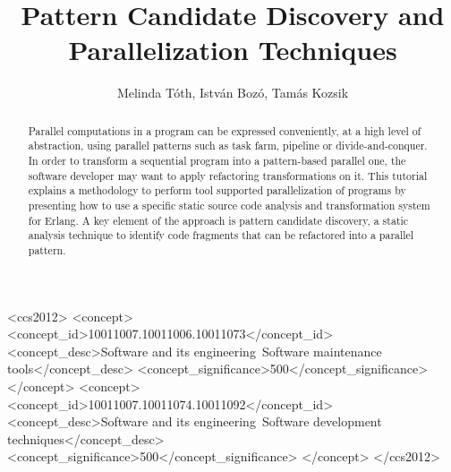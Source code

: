 \documentclass[sigconf]{acmart}
\begin{document}
\title[Pattern Candidate Discovery and Parallelization Techniques]{Pattern Candidate Discovery and \\ Parallelization Techniques}

\author{Melinda T\'oth, Istv\'an Boz\'o, Tam\'as Kozsik}



\begin{abstract}
Parallel computations in a program can be expressed conveniently,
at a high level of abstraction, using parallel patterns such as
task farm, pipeline or divide-and-conquer. In order to transform a sequential
program into a pattern-based parallel one, the software developer
may want to apply refactoring transformations on it. This tutorial
explains a methodology to perform tool supported parallelization of
programs by presenting how to use a specific static source code
analysis and transformation system for Erlang. A key element of the
approach is pattern candidate discovery, a static analysis technique
to identify code fragments that can be refactored into a parallel
pattern.
\end{abstract}


\begin{CCSXML}
<ccs2012>
<concept>
<concept_id>10011007.10011006.10011073</concept_id>
<concept_desc>Software and its engineering~Software maintenance tools</concept_desc>
<concept_significance>500</concept_significance>
</concept>
<concept>
<concept_id>10011007.10011074.10011092</concept_id>
<concept_desc>Software and its engineering~Software development techniques</concept_desc>
<concept_significance>500</concept_significance>
</concept>
</ccs2012>
\end{CCSXML}

\end{document}
